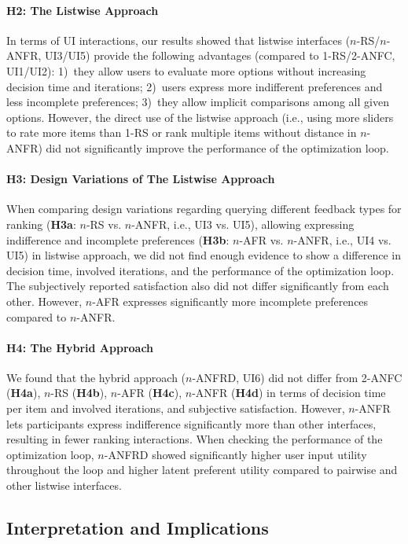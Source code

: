 \documentclass[acmsmall,screen,nonacm]{acmart}
\begin{document}
\paragraph{H2: The Listwise Approach}
In terms of UI interactions, our results showed that listwise interfaces ($n$-RS/$n$-ANFR, UI3/UI5) provide the following advantages (compared to 1-RS/2-ANFC, UI1/UI2):
1)~they allow users to evaluate more options without increasing decision time and iterations;
2)~users express more indifferent preferences and less incomplete preferences;
3)~they allow implicit comparisons among all given options.
%
However, the direct use of the listwise approach (i.e., using more sliders to rate more items than 1-RS or rank multiple items without distance in $n$-ANFR) did not significantly improve the performance of the optimization loop.

\paragraph{H3: Design Variations of The Listwise Approach}
When comparing design variations regarding querying different feedback types for ranking (\textbf{H3a}: $n$-RS vs. $n$-ANFR, i.e., UI3 vs. UI5), allowing expressing indifference and incomplete preferences (\textbf{H3b}: $n$-AFR vs. $n$-ANFR, i.e., UI4 vs. UI5) in listwise approach,
%
we did not find enough evidence to show a difference in decision time, involved iterations, and the performance of the optimization loop. The subjectively reported satisfaction also did not differ significantly from each other.
%
However, $n$-AFR expresses significantly more incomplete preferences compared to $n$-ANFR.

\paragraph{H4: The Hybrid Approach}
We found that the hybrid approach ($n$-ANFRD, UI6) did not differ from 2-ANFC (\textbf{H4a}), $n$-RS (\textbf{H4b}), $n$-AFR (\textbf{H4c}), $n$-ANFR (\textbf{H4d}) in terms of decision time per item and involved iterations, and subjective satisfaction.
%
However, $n$-ANFR lets participants express indifference significantly more than other interfaces, resulting in fewer ranking interactions. When checking the performance of the optimization loop, $n$-ANFRD showed significantly higher user input utility throughout the loop and higher latent preferent utility compared to pairwise and other listwise interfaces.

\subsection{Interpretation and Implications}
\end{document}
